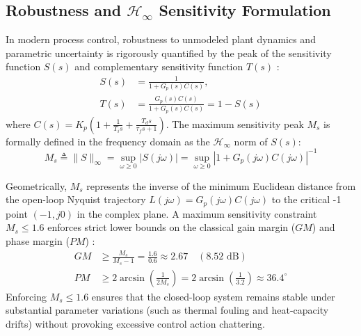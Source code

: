 \subsection{Robustness and $\mathcal{H}_\infty$ Sensitivity Formulation}
\label{subsec:sensitivity_theory}
In modern process control, robustness to unmodeled plant dynamics and parametric uncertainty is rigorously quantified by the peak of the sensitivity function $S(s)$ and complementary sensitivity function $T(s)$ \cite{astrom2006pid, skogestad2005multivariable}:
\begin{align}
    S(s) &= \frac{1}{1 + G_p(s) C(s)}, \label{eq:sensitivity_func} \\
    T(s) &= \frac{G_p(s) C(s)}{1 + G_p(s) C(s)} = 1 - S(s) \label{eq:comp_sensitivity_func}
\end{align}
where $C(s) = K_p \left(1 + \frac{1}{T_i s} + \frac{T_d s}{\tau_f s + 1}\right)$. The maximum sensitivity peak $M_s$ is formally defined in the frequency domain as the $\mathcal{H}_\infty$ norm of $S(s)$:
\begin{equation}
    M_s \triangleq \|S\|_\infty = \sup_{\omega \ge 0} |S(j\omega)| = \sup_{\omega \ge 0} \left| 1 + G_p(j\omega) C(j\omega) \right|^{-1}
    \label{eq:ms_peak}
\end{equation}

Geometrically, $M_s$ represents the inverse of the minimum Euclidean distance from the open-loop Nyquist trajectory $L(j\omega) = G_p(j\omega)C(j\omega)$ to the critical -1 point $(-1, j0)$ in the complex plane. A maximum sensitivity constraint $M_s \le 1.6$ enforces strict lower bounds on the classical gain margin ($GM$) and phase margin ($PM$) \cite{garpinger2014performance, padula2012optimal}:
\begin{align}
    GM &\ge \frac{M_s}{M_s - 1} = \frac{1.6}{0.6} \approx 2.67 \quad (8.52\text{ dB}) \label{eq:gain_margin} \\
    PM &\ge 2 \arcsin\left(\frac{1}{2 M_s}\right) = 2 \arcsin\left(\frac{1}{3.2}\right) \approx 36.4^\circ \label{eq:phase_margin}
\end{align}
Enforcing $M_s \le 1.6$ ensures that the closed-loop system remains stable under substantial parameter variations (such as thermal fouling and heat-capacity drifts) without provoking excessive control action chattering.
